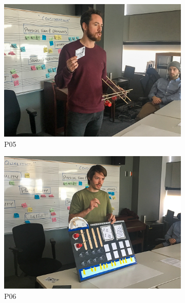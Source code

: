 \documentclass[letterpaper, 12pt]{article}
\begin{document}
\begin{figure}[htbp]
    \centering
    \begin{subfigure}{0.49\textwidth}
        \centering
        \includegraphics[width=1\textwidth]{CMJ1.jpg}
        \caption{P05}
        \label{ch3-fig:presentations_P05}
    \end{subfigure}
    \begin{subfigure}{0.49\textwidth}
        \centering
        \includegraphics[width=1\textwidth]{CMJ2.jpg}
        \caption{P06}
        \label{ch3-fig:presentations_P06}
    \end{subfigure}
    \begin{subfigure}{0.49\textwidth}
        \centering

\end{subfigure}
\end{figure}
\end{document}
